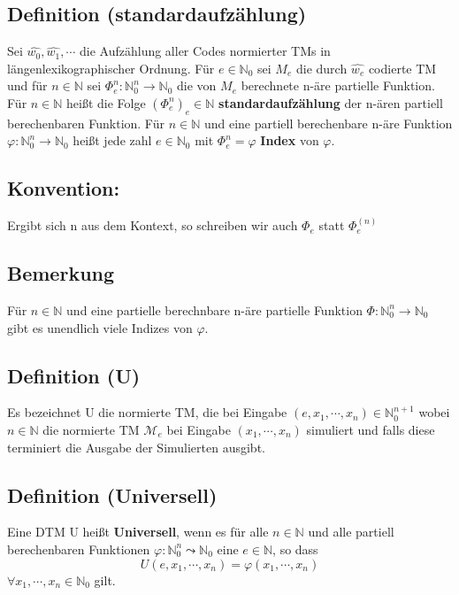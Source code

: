 \documentclass[a4paper,11pt]{article}
\begin{document}
\subsection{Definition (standardaufzählung)} Sei $\hat{w_0}, \hat{w_1}, \cdots$ die Aufzählung aller Codes normierter TMs in längenlexikographischer Ordnung. Für $e \in \mathbb{N}_0$ sei $M_e$ die durch $\hat{w_e}$ codierte TM und für $n \in \mathbb{N}$ sei $\Phi_e^n : \mathbb{N}_0^n \rightarrow \mathbb{N}_0$ die von $M_e$ berechnete n-äre partielle Funktion. Für $n \in \mathbb{N}$ heißt die Folge $(\Phi_e^n)_e\in \mathbb{N}$ \textbf{standardaufzählung} der n-ären partiell berechenbaren Funktion. Für $n \in \mathbb{N} $ und eine partiell berechenbare n-äre Funktion $\varphi: \mathbb{N}_0^n \rightarrow \mathbb{N}_0$ heißt jede zahl $e \in \mathbb{N}_0$ mit $\Phi_e^n = \varphi$ \textbf{Index} von $\varphi$.

\subsection*{Konvention: } Ergibt sich n aus dem Kontext, so schreiben wir auch $\Phi_e$ statt $\Phi_e^(n)$

\subsection{Bemerkung} Für $n \in \mathbb{N}$ und eine partielle berechnbare n-äre partielle Funktion $\Phi : \mathbb{N}_0^n \rightarrow \mathbb{N}_0$ gibt es unendlich viele Indizes von $\varphi$.

\subsection{Definition (U)} Es bezeichnet U die normierte TM, die bei Eingabe $(e, x_1, \cdots, x_n) \in \mathbb{N}_0^{n+1}$ wobei $n \in \mathbb{N}$ die normierte TM $\mathcal{M}_e$ bei Eingabe $(x_1, \cdots, x_n)$ simuliert und falls diese terminiert die Ausgabe der Simulierten ausgibt.

\subsection{Definition (Universell)} Eine DTM U heißt \textbf{Universell}, wenn es für alle $n \in \mathbb{N}$ und alle partiell berechenbaren Funktionen $\varphi : \mathbb{N}_0^n \leadsto \mathbb{N}_0$ eine $e \in \mathbb{N}$, so dass \[U(e, x_1, \cdots, x_n) = \varphi(x_1, \cdots, x_n)\] $\forall x_1, \cdots, x_n \in \mathbb{N}_0$ gilt.
\end{document}
